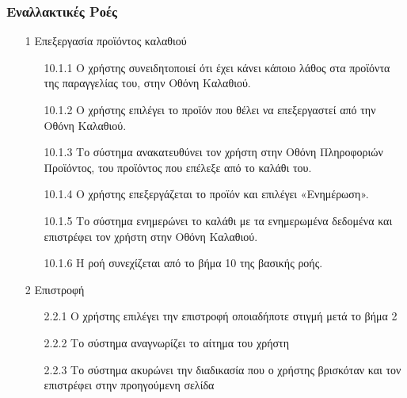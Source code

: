 \documentclass[12pt,a4paper,twoside]{book}
\begin{document}
\subsubsection{Εναλλακτικές Ροές}
\begin{enumerate}
  \item[1 ] Επεξεργασία προϊόντος καλαθιού  %
        \begin{enumerate}
          \item[10.1.1 ] Ο χρήστης συνειδητοποιεί ότι έχει κάνει κάποιο λάθος στα προϊόντα της παραγγελίας του, στην Οθόνη Καλαθιού. %
          \item[10.1.2 ] Ο χρήστης επιλέγει το προϊόν που θέλει να επεξεργαστεί από την Οθόνη Καλαθιού. %
          \item[10.1.3 ] Το σύστημα ανακατευθύνει τον χρήστη στην Οθόνη Πληροφοριών Προϊόντος, του προϊόντος που επέλεξε από το καλάθι του.
          \item[10.1.4 ] Ο χρήστης επεξεργάζεται το προϊόν και επιλέγει «Ενημέρωση».
          \item[10.1.5 ] Το σύστημα ενημερώνει το καλάθι με τα ενημερωμένα δεδομένα και επιστρέφει τον χρήστη στην Οθόνη Καλαθιού. %
          \item[10.1.6 ] Η ροή συνεχίζεται από το βήμα 10 της βασικής ροής.
        \end{enumerate}
  \item[2 ] Επιστροφή
        \begin{enumerate}
          \item[2.2.1 ] Ο χρήστης επιλέγει την επιστροφή οποιαδήποτε στιγμή μετά το βήμα 2 %
          \item[2.2.2 ] Το σύστημα αναγνωρίζει το αίτημα του χρήστη %
          \item[2.2.3 ] Το σύστημα ακυρώνει την διαδικασία που ο χρήστης βρισκόταν και τον επιστρέφει στην προηγούμενη σελίδα %
        \end{enumerate}
\end{enumerate}
\end{document}
